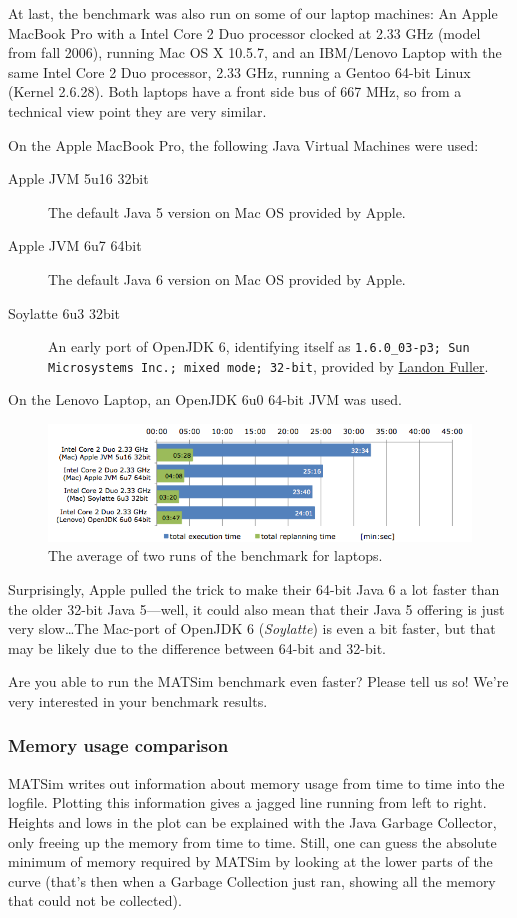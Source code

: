 At last, the benchmark was also run on some of our laptop machines: An Apple MacBook Pro with a Intel Core 2 Duo processor clocked at 2.33 GHz (model from fall 2006), running Mac OS X 10.5.7, and an IBM/Lenovo Laptop with the same Intel Core 2 Duo processor, 2.33 GHz, running a Gentoo 64-bit Linux (Kernel 2.6.28). Both laptops have a front side bus of 667 MHz, so from a technical view point they are very similar.

On the Apple MacBook Pro, the following Java Virtual Machines were used:

\begin{description}
\item[Apple JVM 5u16 32bit]\quad The default Java 5 version on Mac OS provided by Apple.
\item[Apple JVM 6u7 64bit]\quad The default Java 6 version on Mac OS provided by Apple.
\item[Soylatte 6u3 32bit]\quad An early port of OpenJDK 6, identifying itself as \texttt{1.6.0\_03-p3; Sun Microsystems Inc.; mixed mode; 32-bit}, provided by \href{http://landonf.bikemonkey.org/static/soylatte/}{Landon Fuller}.
\end{description}
On the Lenovo Laptop, an OpenJDK 6u0 64-bit JVM was used.
\begin{figure}[h]
\centering
\includegraphics[width=0.75\linewidth]{figures/benchmarks/benchmark3}
\caption{The average of two runs of the benchmark for laptops.}
\label{fig:Benchmark03}
\end{figure}
Surprisingly, Apple pulled the trick to make their 64-bit Java 6 a lot faster than the older 32-bit Java 5—well, it could also mean that their Java 5 offering is just very slow\ldots The Mac-port of OpenJDK 6 (\emph{Soylatte}) is even a bit faster, but that may be likely due to the difference between 64-bit and 32-bit.

Are you able to run the MATSim benchmark even faster? Please tell us so! We're very interested in your benchmark results.

\subsubsection{Memory usage comparison}
MATSim writes out information about memory usage from time to time into the logfile. Plotting this information gives a jagged line running from left to right. Heights and lows in the plot can be explained with the Java Garbage Collector, only freeing up the memory from time to time. Still, one can guess the absolute minimum of memory required by MATSim by looking at the lower parts of the curve (that's then when a Garbage Collection just ran, showing all the memory that could not be collected).

